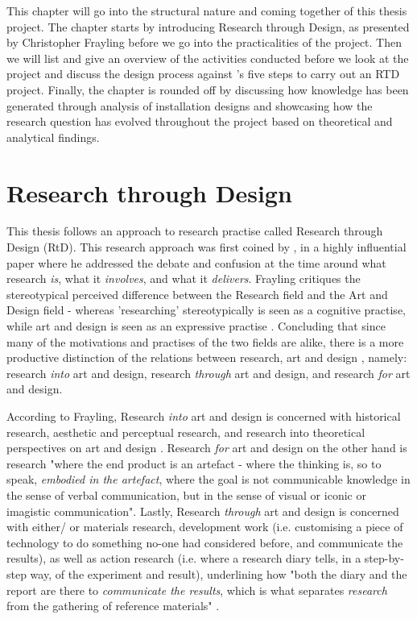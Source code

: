 This chapter will go into the structural nature and coming together of this thesis project. The chapter starts by introducing Research through Design, as presented by Christopher Frayling before we go into the practicalities of the project. Then we will list and give an overview of the activities conducted before we look at the project and discuss the design process against \autocite{zimmerman_research_2014}'s five steps to carry out an RTD project. Finally, the chapter is rounded off by discussing how knowledge has been generated through analysis of installation designs and showcasing how the research question has evolved throughout the project based on theoretical and analytical findings.

\section{Research through Design}
This thesis follows an approach to research practise called Research through Design (RtD). This research approach was first coined by \autocite{frayling_1994}, in a highly influential paper where he addressed the debate and confusion at the time around what research \emph{is}, what it \emph{involves}, and what it \emph{delivers}. Frayling critiques the stereotypical perceived difference between the Research field and the Art and Design field - whereas 'researching' stereotypically is seen as a cognitive practise, while art and design is seen as an expressive practise \autocite[p. 5]{frayling_1994}. Concluding that since many of the motivations and practises of the two fields are alike, there is a more productive distinction of the relations between research, art and design \autocite[p. 5]{frayling_1994}, namely: research \emph{into} art and design, research \emph{through} art and design, and research \emph{for} art and design.

According to Frayling, Research \emph{into} art and design is concerned with historical research, aesthetic and perceptual research, and research into theoretical perspectives on art and design \autocite[p. 5]{frayling_1994}. Research \emph{for} art and design on the other hand is research "where the end product is an artefact - where the thinking is, so to speak, \emph{embodied in the artefact}, where the goal is not communicable knowledge in the sense of verbal communication, but in the sense of visual or iconic or imagistic communication"\autocite[p. 5]{frayling_1994}. Lastly, Research \emph{through} art and design is concerned with either/ or materials research, development work (i.e. customising a piece of technology to do something no-one had considered before, and communicate the results), as well as action research (i.e. where a research diary tells, in a step-by-step way, of the experiment and result), underlining how "both the diary and the report are there to \emph{communicate the results}, which is what separates \emph{research} from the gathering of reference materials" \autocite[p. 5]{frayling_1994}.
\par

